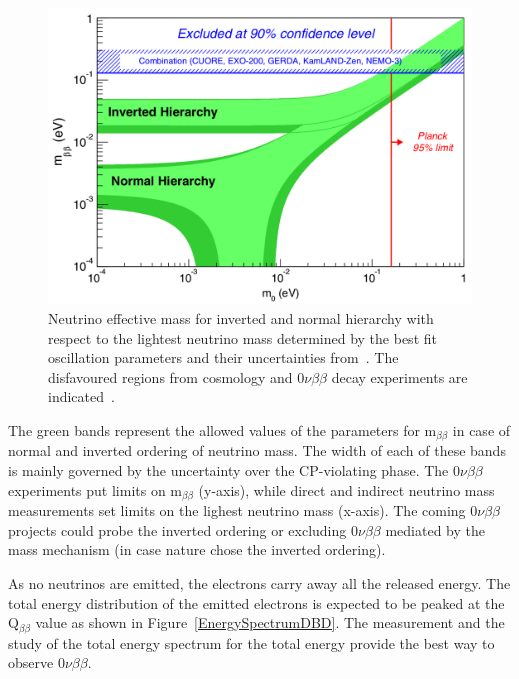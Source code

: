 \documentclass[main.tex]{subfiles}
\begin{document}
\begin{figure}[h!]
\begin{center}
\includegraphics[scale=0.35]{pictures/Chap2/m1NuMassContours2sigma_v4.png}
\caption{Neutrino effective mass for inverted and normal hierarchy with respect to the lightest neutrino mass determined by the best fit oscillation parameters and their uncertainties from~\cite{GlobalFitNeutrinoParameter}. The disfavoured regions from cosmology and 0$\nu\beta\beta$ decay experiments are indicated~\cite{MeffVsM0}.}
\label{EffectiveMassNMM}
\end{center}
\end{figure}


\NI The green bands represent the allowed values of the parameters for m$_{\beta\beta}$ in case of normal and inverted ordering of neutrino mass. The width of each of these bands is mainly governed by the uncertainty over the CP-violating phase. The 0$\nu\beta\beta$ experiments put limits on m$_{\beta\beta}$ (y-axis), while direct and indirect neutrino mass measurements set limits on the lighest neutrino mass (x-axis). The coming 0$\nu\beta\beta$ projects could probe the inverted ordering or excluding 0$\nu\beta\beta$ mediated by the mass mechanism (in case nature chose the inverted ordering).


\bigskip


\NI As no neutrinos are emitted, the electrons carry away all the released energy. The total energy distribution of the emitted electrons is expected to be peaked at the Q$_{\beta\beta}$ value as shown in Figure~\ref{EnergySpectrumDBD}. The measurement and the study of the total energy spectrum for the total energy provide the best way to observe 0$\nu\beta\beta$.
\end{document}
